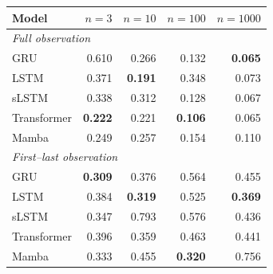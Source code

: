 \begin{tabular}{lrrrr}
\toprule
Model & $n{=}3$ & $n{=}10$ & $n{=}100$ & $n{=}1000$ \\
\midrule
\multicolumn{5}{l}{\emph{Full observation}} \\
GRU & 0.610 & 0.266 & 0.132 & \textbf{0.065} \\
LSTM & 0.371 & \textbf{0.191} & 0.348 & 0.073 \\
sLSTM & 0.338 & 0.312 & 0.128 & 0.067 \\
Transformer & \textbf{0.222} & 0.221 & \textbf{0.106} & 0.065 \\
Mamba & 0.249 & 0.257 & 0.154 & 0.110 \\
\midrule
\multicolumn{5}{l}{\emph{First--last observation}} \\
GRU & \textbf{0.309} & 0.376 & 0.564 & 0.455 \\
LSTM & 0.384 & \textbf{0.319} & 0.525 & \textbf{0.369} \\
sLSTM & 0.347 & 0.793 & 0.576 & 0.436 \\
Transformer & 0.396 & 0.359 & 0.463 & 0.441 \\
Mamba & 0.333 & 0.455 & \textbf{0.320} & 0.756 \\
\bottomrule
\end{tabular}
